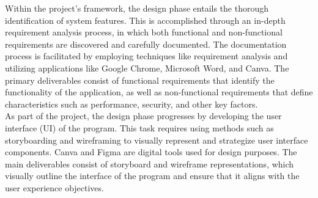 Within the project's framework, the design phase entails the thorough identification of system features. This is accomplished through an in-depth requirement analysis process, in which both functional and non-functional requirements are discovered and carefully documented. The documentation process is facilitated by employing techniques like requirement analysis and utilizing applications like Google Chrome, Microsoft Word, and Canva. The primary deliverables consist of functional requirements that identify the functionality of the application, as well as non-functional requirements that define characteristics such as performance, security, and other key factors. \\

As part of the project, the design phase progresses by developing the user interface (UI) of the program. This task requires using methods such as storyboarding and wireframing to visually represent and strategize user interface components. Canva and Figma are digital tools used for design purposes. The main deliverables consist of storyboard and wireframe representations, which visually outline the interface of the program and ensure that it aligns with the user experience objectives. \\

